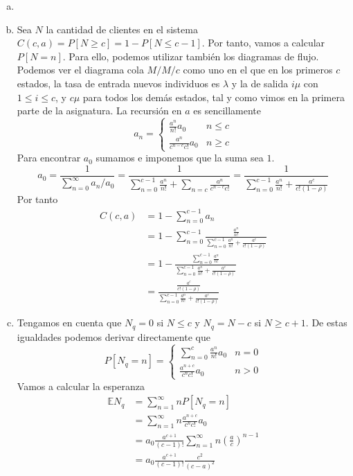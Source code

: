 \documentclass[twoside]{article}
\begin{document}
\begin{solucion}
\begin{enumerate}[(a)]
\item[]
\item Sea $N$ la cantidad de clientes en el sistema $C(c,a)=P[N\geq c] = 1-P[N\leq c-1]$. Por tanto, vamos a calcular $P[N=n]$. Para ello, podemos utilizar también los diagramas de flujo. Podemos ver el diagrama cola $M/M/c$ como uno en el que  en los primeros $c$ estados, la tasa de entrada nuevos individuos es $\lambda$ y la de salida $i \mu$ con $1 \leq i \leq c$, y $c\mu$ para todos los demás estados, tal y como vimos en la primera parte de la asignatura. La recursión en $a$ es sencillamente
$$
a_n = \begin{cases}
\frac{a^n}{n!}a_0 & n\leq c\\
\frac{a^n}{c^{n-c}c!}a_0 & n\geq c
\end{cases}
$$
Para encontrar $a_0$ sumamos e imponemos que la suma sea $1$.
$$
a_0 = \frac{1}{\sum_{n=0}^\infty a_n/a_0} = \frac{1}{\sum_{n=0}^{c-1}\frac{a^n}{n!} + \sum_{n=c}\frac{a^n}{c^{n-c}c!}} = \frac{1}{\sum_{n=0}^{c-1}\frac{a^n}{n!} + \frac{a^c}{c!(1-\rho)}} 
$$
Por tanto
\begin{align*}
C(c,a)&= 1- \sum_{n=0}^{c-1} a_n\\
&= 1 - \sum_{n=0}^{c-1}\frac{\frac{a^n}{n!}}{\sum_{n=0}^{c-1}\frac{a^n}{n!} + \frac{a^c}{c!(1-\rho)}}\\
&=1 -\frac{ \sum_{n=0}^{c-1}\frac{a^n}{n!}}{\sum_{n=0}^{c-1}\frac{a^n}{n!} + \frac{a^c}{c!(1-\rho)}}\\
&=\frac{\frac{a^c}{c!(1-\rho)}}{\sum_{n=0}^{c-1}\frac{a^n}{n!} + \frac{a^c}{c!(1-\rho)}}
\end{align*}
\item Tengamos en cuenta que $N_q = 0$ si $N\leq c$ y $N_q = N-c$ si $N\geq c+1$. De estas igualdades podemos derivar directamente que
$$
P[N_q = n] = \begin{cases}
\sum_{n=0}^c \frac{a^n}{n!}a_0 & n=0\\
\frac{a^{n+c}}{c^nc!}a_0 & n>0
\end{cases}
$$
Vamos a calcular la esperanza
\begin{align*}
\mathbb{E}N_q &= \sum_{n=1}^\infty n P[N_q =n] \\
& = \sum_{n=1}^\infty n \frac{a^{n+c}}{c^n c!}a_0\\
&= a_0\frac{a^{c+1}}{(c-1)!}\sum_{n=1}^\infty n \left(\frac{a}{c}\right)^{n-1}\\
&= a_0\frac{a^{c+1}}{(c-1)!}\frac{c^2}{(c-a)^2}\\

\end{align*}
\end{enumerate}
\end{solucion}
\end{document}
